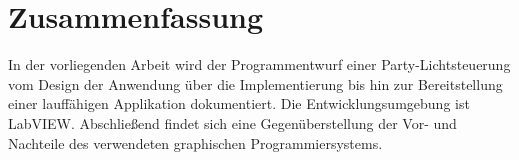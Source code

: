 \label{chap:Zusammenfassung}
\section*{Zusammenfassung}

In der vorliegenden Arbeit wird der Programmentwurf einer Party-Lichtsteuerung vom Design der Anwendung über die Implementierung bis hin zur Bereitstellung einer lauffähigen Applikation dokumentiert.
Die Entwicklungsumgebung ist LabVIEW. Abschließend findet sich eine Gegenüberstellung der Vor- und Nachteile des verwendeten graphischen Programmiersystems.


